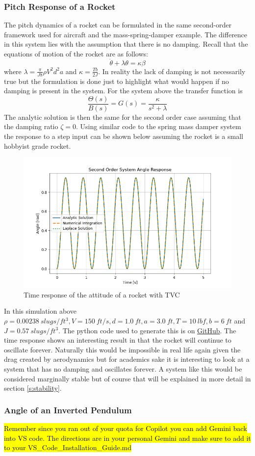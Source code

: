 \subsubsection{Pitch Response of a Rocket}\label{s:rocket_response}

The pitch dynamics of a rocket can be formulated in the same second-order framework used for aircraft and the mass-spring-damper example. The difference in this system lies with the assumption that there is no damping. Recall that the equations of motion of the rocket are as follows:
\begin{equation}
    \ddot{\theta} + \lambda \theta = \kappa \beta
\end{equation}
where $\lambda=\frac{\pi}{J8}\rho V^2 d^2 a$ and $\kappa=\frac{Tb}{2J}$. In reality the lack of damping is not necessarily true but the formulation is done just to highlight what would happen if no damping is present in the system. For the system above the transfer function is
\begin{equation}
  \frac{\Theta(s)}{B(s)} = G(s) = \frac{\kappa}{s^2+\lambda}
\end{equation}
The analytic solution is then the same for the second order case assuming that the damping ratio $\zeta=0$. Using similar code to the spring mass damper system the response to a step input can be shown below assuming the rocket is a small hobbyist grade rocket. 
\begin{figure}[H]
\centering
\includegraphics[width=0.8\linewidth]{Figures/rocket_response.png}
\caption{Time response of the attitude of a rocket with TVC}
\label{f:rocket_response}
\end{figure}
\noindent In this simulation above $\rho=0.00238~slugs/ft^3,V=150~ft/s,d=1.0~ft,a=3.0~ft,T=10~lbf,b=6~ft$ and $J=0.57~slugs/ft^3$. The python code used to generate this is on \href{https://github.com/cmontalvo251/Python/blob/master/controls/rocket.py}{GitHub}. The time response shows an interesting result in that the rocket will continue to oscillate forever. Naturally this would be impossible in real life again given the drag created by aerodynamics but for academics sake it is interesting to look at a system that has no damping and oscillates forever. A system like this would be considered marginally stable but of course that will be explained in more detail in section \ref{s:stability}.

\subsubsection{Angle of an Inverted Pendulum}

\hl{Remember since you ran out of your quota for Copilot you can add Gemini back into VS code. The directions are in your personal Gemini and make sure to add it to your VS_Code_Installation_Guide.md}